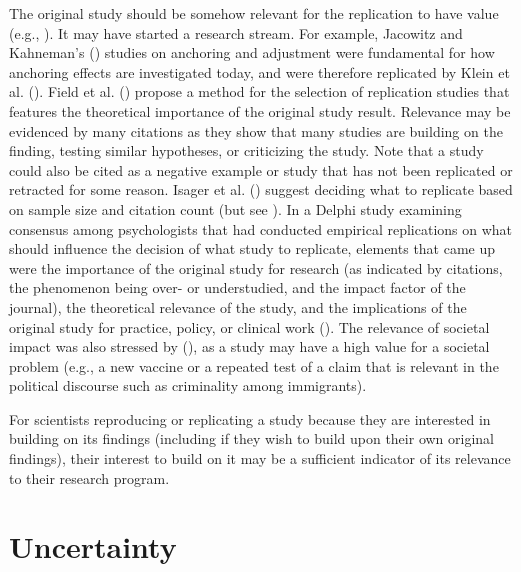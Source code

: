 \documentclass[
  letterpaper,
  DIV=11,
  openany,
  fontsize=12pt,
  parskip=half,
  headings=big,
  numbers=noenddot,
  titlepage=false]{scrreprt}
\begin{document}
The original study should be somehow relevant for the replication to
have value (e.g., ). It may have started a research stream.
For example, Jacowitz and Kahneman's
() studies on anchoring and
adjustment were fundamental for how anchoring effects are investigated
today, and were therefore replicated by Klein et al.
(). Field et al.
() propose a method for the selection
of replication studies that features the theoretical importance of the
original study result. Relevance may be evidenced by many citations as
they show that many studies are building on the finding, testing similar
hypotheses, or criticizing the study. Note that a study could also be
cited as a negative example or study that has not been replicated or
retracted for some reason. Isager et al.
() suggest deciding what to replicate
based on sample size and citation count (but see
). In a Delphi study examining consensus among psychologists that
had conducted empirical replications on what should influence the
decision of what study to replicate, elements that came up were the
importance of the original study for research (as indicated by
citations, the phenomenon being over- or understudied, and the impact
factor of the journal), the theoretical relevance of the study, and the
implications of the original study for practice, policy, or clinical
work (). The
relevance of societal impact was also stressed by
(), as a study may have a high value for
a societal problem (e.g., a new vaccine or a repeated test of a claim
that is relevant in the political discourse such as criminality among
immigrants).

For scientists reproducing or replicating a study because they are
interested in building on its findings (including if they wish to build
upon their own original findings), their interest to build on it may be
a sufficient indicator of its relevance to their research program.

\section{Uncertainty}\label{uncertainty}
\end{document}
